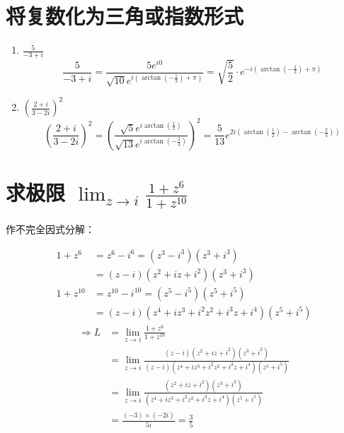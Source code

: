 \documentclass[UTF8]{report}
\theoremstyle{MyLineTheoremStyle} %
\theoremstyle{MyBlockTheoremStyle} %
\theoremstyle{MySubsubsectionStyle} %
\begin{document}
\section{将复数化为三角或指数形式}

\begin{enumerate}
\item $\frac{5}{-3 + i}$
\begin{equation*}
    \frac{5}{-3 + i} = \frac{5e^{i0}}{\sqrt{10}e^{i (\arctan (-\frac{1}{3}) + \pi)}} = \sqrt{\frac{5}{2}}\cdot e^{-i (\arctan (-\frac{1}{3}) + \pi)}
\end{equation*}
\item $\left(\frac{2+i}{3-2i}\right)^2$ 
\begin{equation*}
    \left(\frac{2+i}{3-2i}\right)^2 
    = \left( \frac{\sqrt{5}e^{i \arctan(\frac{1}{2})}}{\sqrt{13}e^{i \arctan(-\frac{2}{3})}} \right)^2 
    = \frac{5}{13} e^{2i\left(\arctan(\frac{1}{2}) - \arctan(-\frac{2}{3})\right) }
\end{equation*}
\end{enumerate}

\section{求极限 $\lim_{z\to i} \frac{1+z^6}{1+z^{10}}$}
作不完全因式分解：

\begin{equation*}
    \begin{aligned}
        1+z^6 
        &= z^6 - i^6 
        = (z^3 - i^3)(z^3 + i^3) \\
        &= (z - i)(z^2 + iz +i^2)(z^3 + i^3) \\ 
        1+z^{10} 
        &= z^{10} - i^{10} = (z^5-i^5)(z^5+i^5) \\
        &= (z-i)(z^4 + iz^3 + i^2z^2 + i^3z + i^4 )(z^5+i^5)
    \end{aligned}
\end{equation*}
\begin{equation*}
    \begin{aligned}
        \Longrightarrow L 
        &= \lim_{z\to i} \frac{1+z^6}{1+z^{10}} \\
        &= \lim_{z\to i} \frac{(z - i)(z^2 + iz +i^2)(z^3 + i^3)}{(z-i)(z^4 + iz^3 + i^2z^2 + i^3z + i^4 )(z^5+i^5)} \\
        &= \lim_{z\to i} \frac{(z^2 + iz +i^2)(z^3 + i^3)}{(z^4 + iz^3 + i^2z^2 + i^3z + i^4 )(z^5+i^5)} \\
        &= \frac{(-3)\times (-2i)}{ 5 i} = \frac{3}{5}
        \end{aligned}
\end{equation*}
\end{document}
